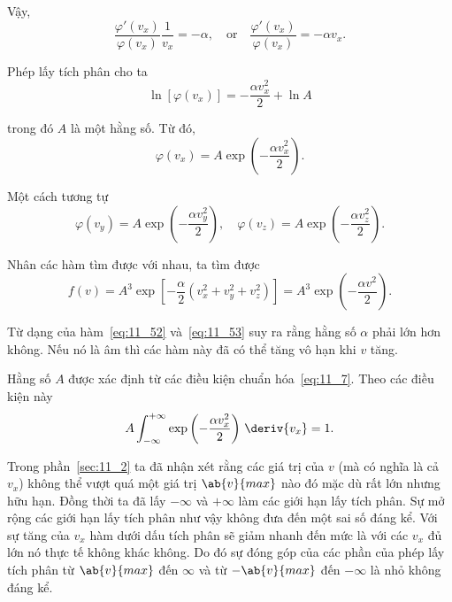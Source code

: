 Vậy,
\begin{equation*}
	\frac{\varphi'(v_x)}{\varphi(v_x)}\frac{1}{v_x} = -\alpha,\quad \text{or}\quad \frac{\varphi'(v_x)}{\varphi(v_x)} = -\alpha v_x.
\end{equation*}

\noindent
Phép lấy tích phân cho ta 
\begin{equation*}
	\ln[\varphi(v_x)] = -\frac{\alpha v_x^2}{2} + \ln{A}
\end{equation*}

\noindent
trong đó $A$ là một hằng số. Từ đó,
\begin{equation}\label{eq:11_52}
	\varphi(v_x) = A \exp\left(-\frac{\alpha v_x^2}{2}\right).
\end{equation}

\noindent
Một cách tương tự
\begin{equation*}
	\varphi(v_y) = A \exp\left(-\frac{\alpha v_y^2}{2}\right),\quad \varphi(v_z) = A \exp\left(-\frac{\alpha v_z^2}{2}\right).
\end{equation*}

\noindent
Nhân các hàm tìm được với nhau, ta tìm được
\begin{equation}\label{eq:11_53}
	f(v) = A^3 \exp\left[-\frac{\alpha}{2}\left(v_x^2+v_y^2+v_z^2\right)\right] = A^3 \exp\left(-\frac{\alpha v^2}{2}\right).
\end{equation}

Từ dạng của hàm~\eqref{eq:11_52} và~\eqref{eq:11_53} suy ra rằng hằng số $\alpha$ phải lớn hơn không. Nếu nó là âm thì các hàm này đã có thể tăng vô hạn khi $v$ tăng.


Hằng số $A$ được xác định từ các điều kiện chuẩn hóa~\eqref{eq:11_7}. Theo các điều kiện này
\begin{equation}\label{eq:11_54}
	A \int_{-\infty}^{+\infty}  \exp\left(-\frac{\alpha v_x^2}{2}\right)\,\deriv{v_x} = 1.
\end{equation}

\noindent
Trong phần~\ref{sec:11_2} ta đã nhận xét rằng các giá trị của $v$ (mà có nghĩa là cả $v_x$) không thể vượt quá một giá trị $\ab{v}{max}$ nào đó mặc dù rất lớn nhưng hữu hạn. Đồng thời ta đã lấy $-\infty$ và $+\infty$ làm các giới hạn lấy tích phân. Sự mở rộng các giới hạn lấy tích phân như vậy không đưa đến một sai số đáng kể. Với sự tăng của $v_x$ hàm dưới dấu tích phân sẽ giảm nhanh đến mức là với các $v_x$ đủ lớn nó thực tế không khác không. Do đó sự đóng góp của các phần của phép lấy tích phân từ $\ab{v}{max}$ đến $\infty$ và từ $-\ab{v}{max}$ đến $-\infty$ là nhỏ không đáng kể.

